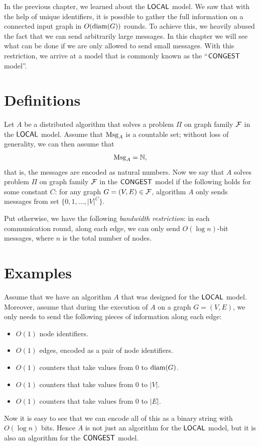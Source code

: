 
In the previous chapter, we learned about the $\textup{\sffamily LOCAL}$ model. We saw that with the help of unique identifiers, it is possible to gather the full information on a connected input graph in $O(\operatorname{diam}(G))$ rounds. To achieve this, we heavily abused the fact that we can send arbitrarily large messages. In this chapter we will see what can be done if we are only allowed to send small messages. With this restriction, we arrive at a model that is commonly known as the ``$\textup{\sffamily CONGEST}$ model''.


\section{Definitions}\label{sec:congest}

Let $A$ be a distributed algorithm that solves a problem $\Pi$ on graph family $\mathcal{F}$ in the $\textup{\sffamily LOCAL}$ model. Assume that $\operatorname{Msg}_A$ is a countable set; without loss of generality, we can then assume that
\[
    \operatorname{Msg}_A = \mathbb{N},
\]
that is, the messages are encoded as natural numbers. Now we say that $A$ solves problem $\Pi$ on graph family $\mathcal{F}$ in the $\textup{\sffamily CONGEST}$ model if the following holds for some constant $C$: for any graph $G = (V,E) \in \mathcal{F}$, algorithm $A$ only sends messages from set $\{0, 1, \dotsc, |V|^C\}$.

Put otherwise, we have the following \emph{bandwidth restriction}: in each communication round, along each edge, we can only send $O(\log n)$-bit messages, where $n$ is the total number of nodes.


\section{Examples}

Assume that we have an algorithm $A$ that was designed for the $\textup{\sffamily LOCAL}$ model. Moreover, assume that during the execution of $A$ on a graph $G = (V,E)$, we only needs to send the following pieces of information along each edge:
\begin{itemize}[noitemsep]
    \item $O(1)$ node identifiers.
    \item $O(1)$ edges, encoded as a pair of node identifiers.
    \item $O(1)$ counters that take values from $0$ to $\operatorname{diam}(G)$.
    \item $O(1)$ counters that take values from $0$ to $|V|$.
    \item $O(1)$ counters that take values from $0$ to $|E|$.
\end{itemize}
Now it is easy to see that we can encode all of this as a binary string with $O(\log n)$ bits. Hence $A$ is not just an algorithm for the $\textup{\sffamily LOCAL}$ model, but it is also an algorithm for the $\textup{\sffamily CONGEST}$ model.

